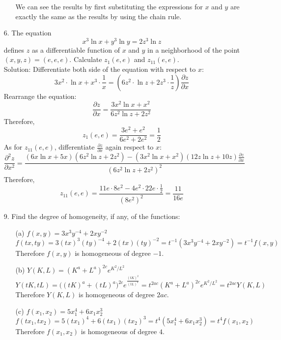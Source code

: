 \documentclass{article}
\begin{document}
\begin{enumerate}
\begin{enumerate}
            We can see the results by first substituting the expressions for $x$ and $y$ are exactly the same as the results by using the chain rule.
        \end{enumerate}

    
    \item[6. ] The equation $$x^3 \ln{x} + y^3 \ln{y} = 2z^3 \ln{z}$$ defines $z$ as a differentiable function of $x$ and $y$ in a neighborhood of the point $(x, y, z) = (e, e, e)$. Calculate $z_1(e, e)$ and $z_{11}(e, e)$. \\
    
    Solution: Differentiate both side of the equation with respect to $x$:
    $$ 3x^2 \cdot \ln{x} + x^3 \cdot \frac{1}{x} = (6z^2 \cdot \ln{z} + 2z^3 \cdot \frac{1}{z})\frac{\partial z}{\partial x} $$
    Rearrange the equation:
    $$ \frac{\partial z}{\partial x} = \frac{3x^2\ln{x} + x^2}{6z^2\ln{z} + 2z^2}$$
    Therefore,
    $$ z_1(e,e) = \frac{3e^2 + e^2}{6e^2 + 2e^2} = \frac{1}{2}$$
    As for $z_{11}(e,e)$, differentiate $\frac{\partial z}{\partial x}$ again respect to $x$:
    $$ \frac{\partial^2 z}{\partial x^2} = \frac{(6x\ln{x}+5x)(6z^2\ln{z}+2z^2)-(3x^2\ln{x}+x^2)(12z\ln{z}+10z)\frac{\partial z}{\partial x}}{(6z^2\ln{z} + 2z^2)^2}$$
    Therefore,
    $$z_{11}(e,e) = \frac{11e\cdot 8e^2 - 4e^2 \cdot 22e \cdot \frac{1}{2}}{(8e^2)^2} = \frac{11}{16e}$$
    
    \item[9. ] Find the degree of homogeneity, if any, of the functions:
        \begin{enumerate}
            \item[(a)] $f(x, y) = 3x^3y^{-4} + 2xy^{-2}$
            $$ f(tx, ty) = 3(tx)^3(ty)^{-4} + 2(tx)(ty)^{-2} = t^{-1}(3x^3y^{-4} + 2xy^{-2}) = t^{-1}f(x,y)$$
            Therefore $f(x,y)$ is homogeneous of degree $-1$. \\
            
            \item[(b)] $Y(K, L) = (K^a + L^a)^{2c}e^{K^2/L^2}$
            $$ Y(tK, tL) = \Big( (tK)^a + (tL)^a \Big)^{2c}e^{\frac{(tK)^2}{(tL)^2}} = t^{2ac}(K^a + L^a)^{2c}e^{K^2/L^2} = t^{2ac}Y(K,L) $$
            Therefore $Y(K,L)$ is homogeneous of degree $2ac$. \\
            
            \item[(c)] $f(x_1, x_2) = 5x_1^4 + 6x_1x_2^3$
            $$ f(tx_1, tx_2) = 5(tx_1)^4 + 6(tx_1)(tx_2)^3 = t^4(5x_1^4 + 6x_1x_2^3) = t^4f(x_1,x_2) $$
            Therefore $f(x_1, x_2)$ is homogeneous of degree $4$. \\
            

\end{enumerate}
\end{enumerate}
\end{document}
